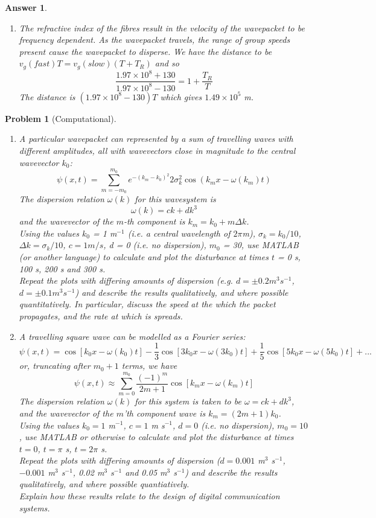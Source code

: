 \documentclass[a4paper]{article}
\newtheorem{ans}{Answer}[section]
\theoremstyle{new}
\newtheorem{qns}{Problem}[section]
\begin{document}
\begin{ans}
\begin{enumerate}[label=(\alph*)]
For $f_0\pm\Delta f$,
$$\Delta u_g=\frac{\partial u_g}{\partial f}\Delta f=-\frac{2\tau c}{(1.5+\tau(2f_0-f_0))^2}\Delta f\implies|\Delta u_g|=\frac{2(10^{-16})(3\times10^8)10^{10}}{(1.5+10^{-16}\times2\times10^{14})^2}=260m/s$$
So the group velocity is $(1.97\times10^8\pm 130)$ m/s.
\item The refractive index of the fibres result in the velocity of the wavepacket to be frequency dependent. As the wavepacket travels, the range of group speeds present cause the wavepacket to disperse. We have the distance to be $v_g(fast)T=v_g(slow)(T+T_R)$ and so
$$\frac{1.97\times10^8+130}{1.97\times10^8-130}=1+\frac{T_R}{T}$$
The distance is $(1.97\times10^8-130)T$ which gives $1.49\times10^5$ m.
\end{enumerate}
\end{ans}
\begin{qns}[Computational]\leavevmode
\begin{enumerate}[label=(\alph*)]
\item A particular wavepacket can represented by a sum of travelling waves with different amplitudes, all with wavevectors close in magnitude to the central wavevector $k_0$:
$$\psi(x,t)=\sum_{m=-m_0}^{m_0}e^{-(k_m-k_0)^2}{2\sigma_k^2}\cos(k_mx-\omega(k_m)t)$$
The dispersion relation $\omega (k)$ for this wavesystem is
$$\omega(k) = ck + dk^3$$
and the wavevector of the $m$-th component is $k_m=k_0+m\Delta k$.\\[5pt] 
Using the values $k_0$ = 1 m$^{-1}$ (i.e. a central wavelength of $2\pi$m), $\sigma_k=k_0/10$, $\Delta k=\sigma_k/10$, $c = 1m/s$, d = 0 (i.e. no dispersion), $m_0$ = 30, use MATLAB (or another language) to calculate and plot the disturbance at times $t$ = 0 s, 100 s, 200 s and 300 s.\\[5pt]
Repeat the plots with differing amounts of dispersion (e.g. $d=\pm0.2m^3s^{-1}$, $d=\pm0.1m^3s^{-1}$) and describe the results qualitatively, and where possible quantitatively. In particular, discuss the speed at the which the packet propagates, and the rate at which is spreads.
\item A travelling square wave can be modelled as a Fourier series:
$$\psi(x,t)=\cos[k_0x-\omega(k_0)t]-\frac{1}{3}\cos[3k_0x-\omega(3k_0)t]+\frac{1}{5}\cos[5k_0x-\omega(5k_0)t]+...$$
or, truncating after $m_0+1$ terms, we have
$$\psi(x,t)\approx\sum_{m=0}^{m_0}\frac{(-1)^m}{2m+1}\cos[k_mx-\omega(k_m)t]$$
The dispersion relation $\omega(k)$ for this system is taken to be $\omega=ck+dk^3$, and the wavevector of the $m$'th component wave is $k_m=(2m+1)k_0$.\\[5pt] 
Using the values $k_0=1$ m$^{-1}$, $c=1$ m s$^{-1}$, $d=0$ (i.e. no dispersion), $m_0=10$, use MATLAB or otherwise to calculate and plot the disturbance at times $t=0$, $t=\pi$ s, $t=2\pi$ s.\\[5pt]
Repeat the plots with differing amounts of dispersion ($d=0.001$ m$^3$ s$^{-1}$, $-0.001$ m$^3$ s$^{-1}$, 0.02 m$^3$ s$^{-1}$ and 0.05 m$^3$ s$^{-1}$) and describe the results qualitatively, and where possible quantiatively.\\[5pt]
Explain how these results relate to the design of digital communication systems.
\end{enumerate}
\end{qns}
\end{document}
